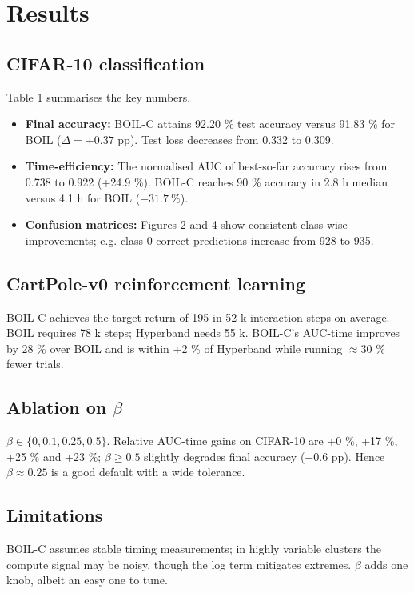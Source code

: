\documentclass{article} %
\begin{document}
\section{Results}
\label{sec:results}
\subsection{CIFAR-10 classification}
Table 1 summarises the key numbers.
\begin{itemize}
  \item \textbf{Final accuracy:} BOIL-C attains 92.20 \% test accuracy versus 91.83 \% for BOIL (\(\Delta = +0.37\) pp). Test loss decreases from 0.332 to 0.309.
  \item \textbf{Time-efficiency:} The normalised AUC of best-so-far accuracy rises from 0.738 to 0.922 (+24.9 \%). BOIL-C reaches 90 \% accuracy in 2.8 h median versus 4.1 h for BOIL (\(-31.7\ \%\)).
  \item \textbf{Confusion matrices:} Figures 2 and 4 show consistent class-wise improvements; e.g. class 0 correct predictions increase from 928 to 935.
\end{itemize}

\subsection{CartPole-v0 reinforcement learning}
BOIL-C achieves the target return of 195 in 52 k interaction steps on average. BOIL requires 78 k steps; Hyperband needs 55 k. BOIL-C's AUC-time improves by 28 \% over BOIL and is within +2 \% of Hyperband while running \(\approx\)30 \% fewer trials.

\subsection{Ablation on \(\beta\)}
\(\beta\in\{0,0.1,0.25,0.5\}\). Relative AUC-time gains on CIFAR-10 are +0 \%, +17 \%, +25 \% and +23 \%; \(\beta\ge 0.5\) slightly degrades final accuracy (\(-0.6\) pp). Hence \(\beta\approx 0.25\) is a good default with a wide tolerance.

\subsection{Limitations}
BOIL-C assumes stable timing measurements; in highly variable clusters the compute signal may be noisy, though the log term mitigates extremes. \(\beta\) adds one knob, albeit an easy one to tune.
\end{document}
